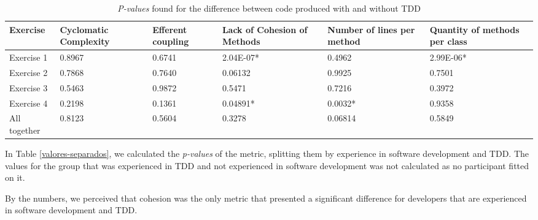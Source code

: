 \documentclass[times]{elsarticle}
\begin{document}
\begin{table*}
	\centering
	\begin{tabular}{ | p{2cm} | p{2cm} | p{1.7cm} | p{2cm} | p{1.7cm} | p{1.7cm} |}
		\hline
		\textbf{Exercise} & \textbf{Cyclomatic Complexity} & \textbf{Efferent coupling} & \textbf{Lack of Cohesion of Methods} & \textbf{Number of lines per method} 
		& \textbf{Quantity of methods per class} \\
		\hline
		Exercise 1 &	0.8967	&	0.6741 &	\cellcolor[gray]{0.8}2.04E-07* &	0.4962 &	\cellcolor[gray]{0.8}2.99E-06* \\
		Exercise 2	& 0.7868	&	0.7640 &	0.06132 &	0.9925 &	0.7501 \\
		Exercise 3	& 0.5463	&	0.9872 &	0.5471 &	0.7216 &	0.3972\\
		Exercise 4	& 0.2198	&	0.1361 &	\cellcolor[gray]{0.8}0.04891* &	\cellcolor[gray]{0.8}0.0032* &	0.9358\\
		\hline
		All together &	0.8123	&	0.5604 &	0.3278 &	0.06814 &	0.5849\\
		\hline
	\end{tabular}
	\caption{\textit{P-values} found for the difference between code produced with and without TDD}
	\label{metricas-industria}
\end{table*}


In Table \ref{valores-separados}, we calculated the \textit{p-values} of the metric,
splitting them by experience in software development and TDD. The values for the group that
was experienced in TDD and not experienced in software development was not calculated as no
participant fitted on it.

By the numbers, we perceived that cohesion was the only metric that presented a significant
difference for developers that are experienced in software development and TDD.
\end{document}
